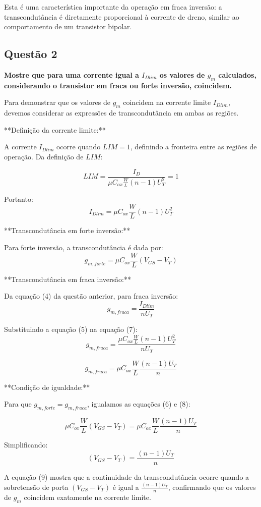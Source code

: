 \documentclass[12pt,a4paper]{article}
\begin{document}
Esta é uma característica importante da operação em fraca inversão: a transcondutância é diretamente proporcional à corrente de dreno, similar ao comportamento de um transistor bipolar.

\subsection*{Questão 2}

\textbf{Mostre que para uma corrente igual a $I_{Dlim}$ os valores de $g_m$ calculados, considerando o transistor em fraca ou forte inversão, coincidem.}

Para demonstrar que os valores de $g_m$ coincidem na corrente limite $I_{Dlim}$, devemos considerar as expressões de transcondutância em ambas as regiões.

**Definição da corrente limite:**

A corrente $I_{Dlim}$ ocorre quando $LIM = 1$, definindo a fronteira entre as regiões de operação. Da definição de $LIM$:

$$LIM = \frac{I_D}{\mu C_{ox} \frac{W}{L} (n-1) U_T^2} = 1$$

Portanto:
$$I_{Dlim} = \mu C_{ox} \frac{W}{L} (n-1) U_T^2 $$

**Transcondutância em forte inversão:**

Para forte inversão, a transcondutância é dada por:
$$g_{m,forte} = \mu C_{ox} \frac{W}{L} (V_{GS} - V_T) $$

**Transcondutância em fraca inversão:**

Da equação (4) da questão anterior, para fraca inversão:
$$g_{m,fraca} = \frac{I_{Dlim}}{nU_T} $$

Substituindo a equação (5) na equação (7):
$$g_{m,fraca} = \frac{\mu C_{ox} \frac{W}{L} (n-1) U_T^2}{nU_T}$$

$$g_{m,fraca} = \mu C_{ox} \frac{W}{L} \frac{(n-1)U_T}{n} $$

**Condição de igualdade:**

Para que $g_{m,forte} = g_{m,fraca}$, igualamos as equações (6) e (8):

$$\mu C_{ox} \frac{W}{L} (V_{GS} - V_T) = \mu C_{ox} \frac{W}{L} \frac{(n-1)U_T}{n}$$

Simplificando:
$$(V_{GS} - V_T) = \frac{(n-1)U_T}{n} $$

A equação (9) mostra que a continuidade da transcondutância ocorre quando a sobretensão de porta $(V_{GS} - V_T)$ é igual a $\frac{(n-1)U_T}{n}$, confirmando que os valores de $g_m$ coincidem exatamente na corrente limite.
\end{document}
